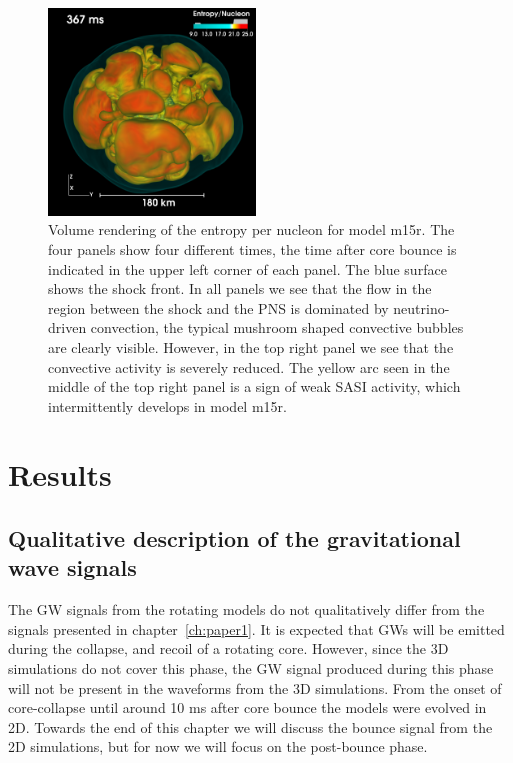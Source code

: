 \begin{figure}[ht]
\includegraphics[width=0.49\textwidth]{./images/paper2/m15r4.png}
\caption{ Volume rendering of the entropy per nucleon for model m15r. The four panels show four different times,
the time after core bounce is indicated in the upper left corner of each panel. 
The blue surface shows the shock front. In all panels we see that the flow in the region between the shock and the PNS
is dominated by neutrino-driven convection, the typical mushroom shaped convective bubbles are clearly visible.
However, in the top right panel we see that the convective activity is severely reduced. The yellow arc seen in the middle of the top right
panel is a sign of weak SASI activity, which intermittently develops in model m15r. 
\label{figp2:3dpics2}}
\end{figure}

\section{Results}
\subsection{Qualitative description of the gravitational wave signals}
The GW signals from the rotating models do not qualitatively differ from the signals presented in chapter~\ref{ch:paper1}. 
It is expected that GWs will be emitted during the collapse, and recoil of a rotating core. However, since the 3D simulations do not cover this phase, 
the GW signal produced during this phase will not be present in the waveforms from the 3D simulations.  From the onset of core-collapse until around 10 
ms after core bounce the models were evolved in 2D.
Towards the end of this chapter we will discuss the bounce signal from the 2D simulations, but for now we will focus on the post-bounce phase.

